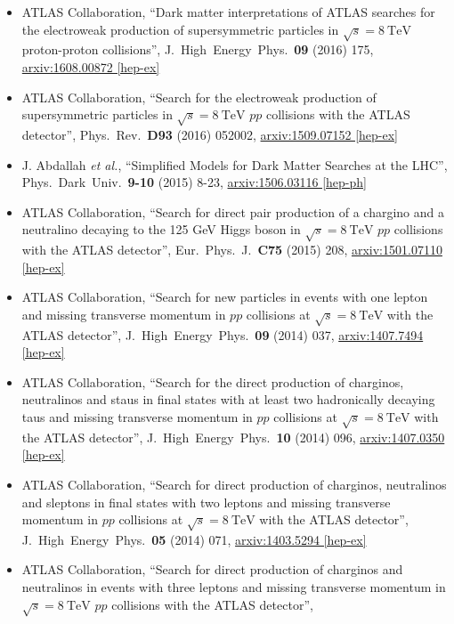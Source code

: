 \documentclass[a4paper,10pt]{article}
\begin{document}
\begin{itemize}
	\item ATLAS Collaboration,
	``Dark matter interpretations of ATLAS searches for the electroweak production of supersymmetric particles in $\sqrt{s} = 8\ \mathrm{TeV}$ proton-proton collisions'',
	J.\ High\ Energy\ Phys.\ {\bf 09} (2016) 175,
	\href{http://arxiv.org/abs/1608.00872}{arxiv:1608.00872 [hep-ex]}
	\item ATLAS Collaboration,
	``Search for the electroweak production of supersymmetric particles in $\sqrt{s} = 8\ \mathrm{TeV}$ $pp$ collisions with the ATLAS detector'',
	Phys.\ Rev.\ {\bf D93} (2016) 052002,
	\href{http://arxiv.org/abs/1509.07152}{arxiv:1509.07152 [hep-ex]}
	\item J. Abdallah {\it et al.},
	``Simplified Models for Dark Matter Searches at the LHC'',
	Phys.\ Dark\ Univ.\ {\bf 9-10} (2015) 8-23,
	\href{http://arxiv.org/abs/1506.03116}{arxiv:1506.03116 [hep-ph]}
	\item ATLAS Collaboration,
	``Search for direct pair production of a chargino and a neutralino decaying to the 125 GeV Higgs boson in $\sqrt{s} = 8\ \mathrm{TeV}$ $pp$ collisions with the ATLAS detector'',
	Eur.\ Phys.\ J.\ {\bf C75} (2015) 208,
	\href{http://arxiv.org/abs/1501.07110}{arxiv:1501.07110 [hep-ex]}
	\item ATLAS Collaboration,
	``Search for new particles in events with one lepton and missing transverse momentum in $pp$ collisions at $\sqrt{s} = 8\ \mathrm{TeV}$ with the ATLAS detector'',
	J.\ High\ Energy\ Phys.\ {\bf 09} (2014) 037,
	\href{http://arxiv.org/abs/1407.7494}{arxiv:1407.7494 [hep-ex]}
	\item ATLAS Collaboration, 
	``Search for the direct production of charginos, neutralinos and staus in final states with at least two hadronically decaying taus and missing transverse momentum in $pp$ collisions at $\sqrt{s} = 8\ \mathrm{TeV}$ with the ATLAS detector'',
	J.\ High\ Energy\ Phys.\ {\bf 10} (2014) 096,
	\href{http://arxiv.org/abs/1407.0350}{arxiv:1407.0350 [hep-ex]}
	\item ATLAS Collaboration, 
	``Search for direct production of charginos, neutralinos and sleptons in final states with two leptons and missing transverse momentum in $pp$ collisions at 
	$\sqrt{s} = 8\ \mathrm{TeV}$ with the ATLAS detector'', 
	J.\ High\ Energy\ Phys.\ {\bf 05} (2014) 071, 
	\href{http://arxiv.org/abs/1403.5294}{arxiv:1403.5294 [hep-ex]}
	\item ATLAS Collaboration, 
	``Search for direct production of charginos and neutralinos in events with three leptons and missing transverse momentum in $\sqrt{s} = 8\ \mathrm{TeV}$ $pp$ collisions with the ATLAS detector'',

\end{itemize}
\end{document}
